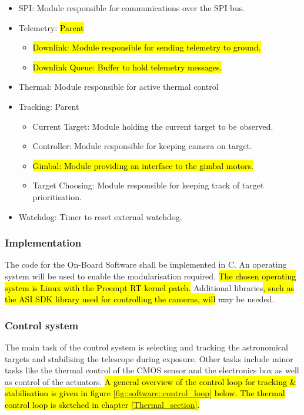 \begin{itemize}
	\item SPI: Module responsible for communications over the SPI bus.

	\item Telemetry: \hl{Parent}
		\begin{itemize}
			\item \hl{Downlink: Module responsible for sending telemetry to ground.}
			\item \hl{Downlink Queue: Buffer to hold telemetry messages.}
		\end{itemize}

	\item Thermal: Module responsible for active thermal control

	\item Tracking: Parent
		\begin{itemize}
			\item Current Target: Module holding the current target to be observed.
			\item Controller: Module responsible for keeping camera on target.
			\item \hl{Gimbal: Module providing an interface to the gimbal motors.}
			\item Target Choosing: Module responsible for keeping track of target prioritisation.
		\end{itemize}

	\item Watchdog: Timer to reset external watchdog.

\end{itemize}

\subsubsection{Implementation}

The code for the On-Board Software shall be implemented in C. An operating system will be used to enable the modularisation required. \hl{The chosen operating system is Linux with the Preempt RT kernel patch.} Additional libraries\hl{, such as the ASI SDK library used for controlling the cameras, will} \st{may} be needed.



\subsubsection{Control system}
The main task of the control system is selecting and tracking the astronomical targets and stabilising the telescope during exposure. Other tasks include minor tasks like the thermal control of the CMOS sensor and the electronics box as well as control of the actuators. \hl{A general overview of the control loop for tracking \& stabilisation is given in figure  \mbox{\ref{fig::software::control_loop}} below. The thermal control loop is sketched in chapter \mbox{\ref{Thermal_section}}. }

